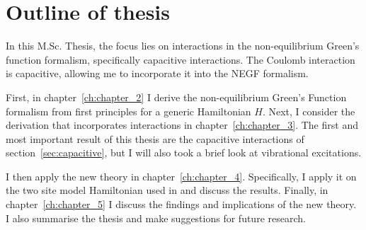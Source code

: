 \section{Outline of thesis}
In this M.Sc. Thesis, the focus lies on interactions in the non-equilibrium Green's function formalism, specifically capacitive interactions. The Coulomb interaction is capacitive, allowing me to incorporate it into the NEGF formalism.

First, in chapter~\ref{ch:chapter_2} I derive the non-equilibrium Green's Function formalism from first principles for a generic Hamiltonian $H$. Next, I consider the derivation that incorporates interactions in chapter~\ref{ch:chapter_3}. The first and most important result of this thesis are the capacitive interactions of section~\ref{sec:capacitive}, but I will also took a brief look at vibrational excitations.

I then apply the new theory  in chapter~\ref{ch:chapter_4}. Specifically, I apply it on the two site model Hamiltonian used in \citet{perrinnano} and discuss the results. Finally, in chapter~\ref{ch:chapter_5} I discuss the findings and implications of the new theory. I also summarise the thesis and make suggestions for future research.

\clearpage
{}